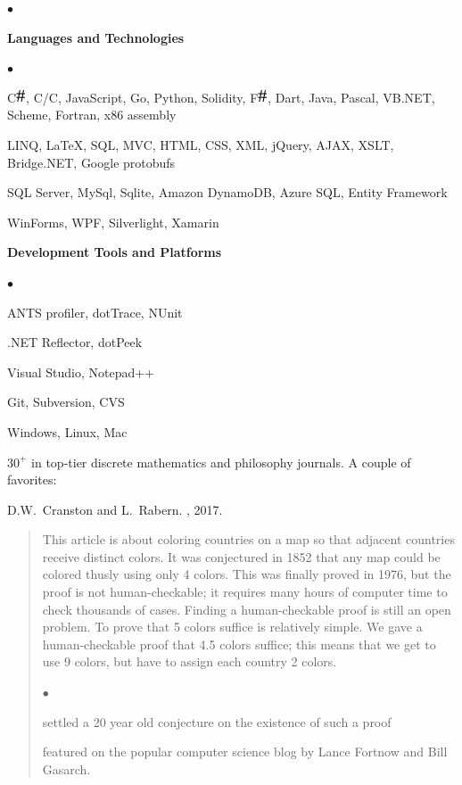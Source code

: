 \documentclass[10pt]{article}
\def\CC{{C\nolinebreak[4]\hspace{-.05em}\raisebox{.4ex}{\tiny\bf ++}}}
\newcommand{\CS}{C\includegraphics{sharp}}
\newcommand{\FS}{F\includegraphics{sharp}}
\newcommand{\resheading}[1]{
  \parbox{\textwidth}{
    \begin{shaded}
      \textbf{\sffamily{\mbox{~}{\large #1}}}
    \end{shaded}
  }
}
\newcommand{\squishlist}{
   \begin{list}{$\bullet$}
    { \setlength{\itemsep}{0pt}    \setlength{\parsep}{0pt}
      \setlength{\topsep}{4.5pt}     \setlength{\partopsep}{0pt}
      \setlength{\leftmargin}{2em} \setlength{\labelwidth}{1.5em}
      \setlength{\labelsep}{0.5em} } }
\newcommand{\squishend}{
    \end{list}  }
\begin{document}
\resheading{Technical Skills}
\squishlist
    \item \textbf{Languages and Technologies}
    \squishlist
        \item \CS{}, C/\CC{}, JavaScript, Go, Python, Solidity, \FS{}, Dart, Java, Pascal, VB.NET, Scheme, Fortran, x86 assembly
        \item LINQ, \LaTeX, SQL, MVC, HTML, CSS, XML, jQuery, AJAX, XSLT, Bridge.NET, Google protobufs
		\item SQL Server, MySql, Sqlite, Amazon DynamoDB, Azure SQL, Entity Framework
        \item WinForms, WPF, Silverlight, Xamarin
    \squishend
    
    \item \textbf{Development Tools and Platforms}
    \squishlist
		\item ANTS profiler, dotTrace, NUnit
  	    \item .NET Reflector, dotPeek
        \item Visual Studio, Notepad++
        \item Git, Subversion, CVS
        \item Windows, Linux, Mac
      \squishend
\squishend
\newpage
\resheading{Research Articles}
{\large$30^+$ \href{https://landon.github.io/#math}{\color{blue}{publications}} in top-tier discrete mathematics and philosophy journals.  
A couple of favorites:}

\vspace{0.25in}
{\large
D.W.~Cranston and L.~Rabern.
\newblock \href{https://landon.github.io/graphdata/Papers/planar%209%20halves.pdf}{\color{blue}{Planar graphs are $\frac92$-colorable}}
, 2017.}

\begin{quote}
This article is about coloring countries on a map so that adjacent countries receive distinct colors.  It was conjectured
in 1852 that any map could be colored thusly using only 4 colors.  This was finally proved in 1976, but the proof is not human-checkable;
it requires many hours of computer time to check thousands of cases.  Finding a human-checkable proof is still an open problem.
To prove that 5 colors suffice is relatively simple.  We gave a human-checkable proof that 4.5 colors suffice; this means that
we get to use 9 colors, but have to assign each country 2 colors.

\squishlist
\item settled a 20 year old conjecture on the existence of such a proof
\item featured on the popular computer science blog 
\href{http://blog.computationalcomplexity.org/2015/10/a-human-readable-proof-that-every.html}{\color{blue}{Computational Complexity}} by Lance Fortnow
and Bill Gasarch.
\squishend
\end{quote}
\end{document}
